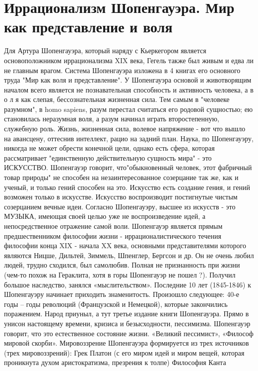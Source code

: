 \documentclass[12pt]{article}
\begin{document}
\section{Иррационализм Шопенгауэра. Мир как представление и воля}
Для Артура Шопенгауэра, который наряду с Кьеркегором является основоположником иррационализма XIX
века, Гегель также был живым и едва ли не главным врагом.
Система Шопенгауэра изложена в 4 книгах его основного труда "Мир как воля и представление".
У Шопенгауэра основой и животворящим началом всего является не познавательная способность и активность
человека, а в о л я как слепая, бессознательная жизненная сила. Тем самым в "человеке разумном", в homo
sapiens, разум перестал считаться его родовой сущностью; ею становилась неразумная воля, а разум начинал
играть второстепенную, служебную роль.
Жизнь, жизненная сила, волевое напряжение - вот что вышло на авансцену, оттеснив интеллект, рацио на
задний план.
Наука, по Шопенгауэру, никогда не может обрести конечной цели, однако есть сфера, которая рассматривает
"единственную действительную сущность мира" - это ИСКУССТВО. Шопенгауэр говорит, что"обыкновенный
человек, этот фабричный товар природы" не способен на незаинтересованное созерцание так же, как и ученый,
и только гений способен на это. Искусство есть создание гения, и гений возможен только в искусстве. Искусство
воспроизводит постигнутые чистым созерцанием вечные идеи.
Согласно Шопенгауэру, высшее из искусств - это МУЗЫКА, имеющая своей целью уже не воспроизведение
идей, а непосредственное отражение самой воли.
Шопенгауэр является прямым предшественником философии жизни - иррационалистического течения
философии конца XIX - начала XX века, основными представителями которого являются Ницше, Дильтей,
Зиммель, Шпенглер, Бергсон и др.
Он не очень любил людей, трудно сходился, был самолюбив. Полная не признанность при жизни (чем-то похож
на Гераклита, хотя в горы Шопенгауэр не пошел ?). Получил большое наследство, занялся «мыслительством».
Последние 10 лет (1845-1846) к Шопенгауэру начинает приходить знаменитость. Произошло следующее: 40-е
годы – годы революций (Французской и Немецкой), которые закончились поражением. Народ приуныл, а тут
третье издание книги Шопенгауэра. Прямо в унисон настоящему времени, кризиса и безысходности,
пессимизма. Шопенгауэр говорит, что это естественное состояние жизни. «Великий пессимист», «Философ
мировой скорби». Мировоззрение Шопенгауэра формируется из трех источников (трех мировоззрений):
Грек Платон (с его миром идей и миром вещей, которая проникнута духом аристократизма, презрения к толпе)
Философия Канта
\end{document}
